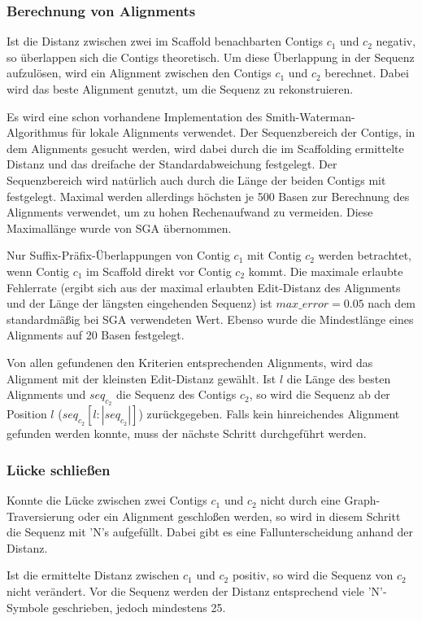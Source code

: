 \documentclass[a4paper,10pt,parskip]{scrartcl}
\begin{document}
\subsubsection{Berechnung von Alignments}
Ist die Distanz zwischen zwei im Scaffold benachbarten Contigs $c_1$
und $c_2$ negativ, so überlappen sich die Contigs theoretisch. Um
diese Überlappung in der Sequenz aufzulösen, wird ein Alignment
zwischen den Contigs $c_1$ und $c_2$ berechnet. Dabei wird das beste
Alignment genutzt, um die Sequenz zu rekonstruieren.

Es wird eine schon vorhandene Implementation des
Smith-Waterman-Algorithmus für lokale Alignments \cite{smith}
verwendet. Der Sequenzbereich der Contigs, in dem Alignments gesucht
werden, wird dabei durch die im Scaffolding ermittelte Distanz und das
dreifache der Standardabweichung festgelegt. Der Sequenzbereich wird
natürlich auch durch die Länge der beiden Contigs mit
festgelegt. Maximal werden allerdings höchsten je 500 Basen zur
Berechnung des Alignments verwendet, um zu hohen Rechenaufwand zu
vermeiden. Diese Maximallänge wurde von SGA übernommen.

Nur Suffix-Präfix-Überlappungen von Contig $c_1$ mit Contig $c_2$
werden betrachtet, wenn Contig $c_1$ im Scaffold direkt vor Contig
$c_2$ kommt. Die maximale erlaubte Fehlerrate (ergibt sich aus der
maximal erlaubten Edit-Distanz des Alignments und der Länge der
längsten eingehenden Sequenz) ist $max\_error = 0.05$ nach dem
standardmäßig bei SGA verwendeten Wert. Ebenso wurde die Mindestlänge
eines Alignments auf 20 Basen festgelegt.

Von allen gefundenen den Kriterien entsprechenden Alignments, wird das
Alignment mit der kleinsten Edit-Distanz gewählt. Ist $l$ die Länge
des besten Alignments und $seq_{c_2}$ die Sequenz des Contigs $c_2$,
so wird die Sequenz ab der Position $l$ ($seq_{c_2}[l:|seq_{c_2}|]$)
zurückgegeben. Falls kein hinreichendes Alignment gefunden werden
konnte, muss der nächste Schritt durchgeführt werden.

\subsubsection{Lücke schließen}
Konnte die Lücke zwischen zwei Contigs $c_1$ und $c_2$ nicht durch
eine Graph-Traversierung oder ein Alignment geschloßen werden, so wird
in diesem Schritt die Sequenz mit 'N's aufgefüllt. Dabei gibt es eine
Fallunterscheidung anhand der Distanz.

Ist die ermittelte Distanz zwischen $c_1$ und $c_2$ positiv, so wird
die Sequenz von $c_2$ nicht verändert. Vor die Sequenz werden der
Distanz entsprechend viele 'N'-Symbole geschrieben, jedoch mindestens
25.
\end{document}

